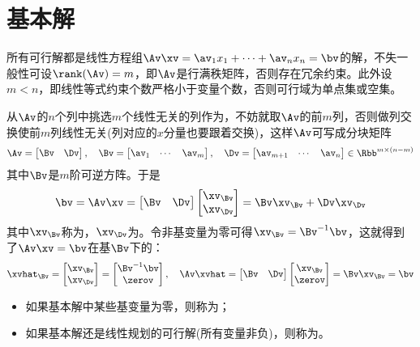\documentclass{ctexart}
\begin{document}
\section{基本解}

所有可行解都是线性方程组$\Av \xv = \av_1 x_1 + \cdots + \av_n x_n = \bv$的解，不失一般性可设$\rank(\Av) = m$，即$\Av$是行满秩矩阵，否则存在冗余约束。此外设$m < n$，即线性等式约束个数严格小于变量个数，否则可行域为单点集或空集。

从$\Av$的$n$个列中挑选$m$个线性无关的列作为，不妨就取$\Av$的前$m$列，否则做列交换使前$m$列线性无关(列对应的$x$分量也要跟着交换)，这样$\Av$可写成分块矩阵
\begin{align*}
    \Av = \begin{bmatrix} \Bv & \Dv \end{bmatrix}, \quad \Bv =
    \begin{bmatrix}
        \av_1 & \cdots & \av_m
    \end{bmatrix}, \quad \Dv =
    \begin{bmatrix}
        \av_{m+1} & \cdots & \av_n
    \end{bmatrix} \in \Rbb^{m \times (n-m)}
\end{align*}
其中$\Bv$是$m$阶可逆方阵。于是
\begin{align*}
    \bv = \Av \xv = \begin{bmatrix} \Bv & \Dv \end{bmatrix}
    \begin{bmatrix} \xv_\Bv \\ \xv_\Dv \end{bmatrix} = \Bv \xv_\Bv + \Dv \xv_\Dv
\end{align*}
其中$\xv_\Bv$称为，$\xv_\Dv$为。令非基变量为零可得$\xv_\Bv = \Bv^{-1} \bv$，这就得到了$\Av \xv = \bv$在基$\Bv$下的：
\begin{align*}
    \xvhat_\Bv = \begin{bmatrix} \xv_\Bv \\ \xv_\Dv \end{bmatrix} = \begin{bmatrix} \Bv^{-1} \bv \\ \zerov \end{bmatrix}, \quad \Av \xvhat = \begin{bmatrix} \Bv & \Dv \end{bmatrix} \begin{bmatrix} \xv_\Bv \\ \zerov \end{bmatrix} = \Bv \xv_\Bv = \bv
\end{align*}
\begin{itemize}
    \item 如果基本解中某些基变量为零，则称为；
    \item 如果基本解还是线性规划的可行解(所有变量非负)，则称为。
\end{itemize}
\end{document}
